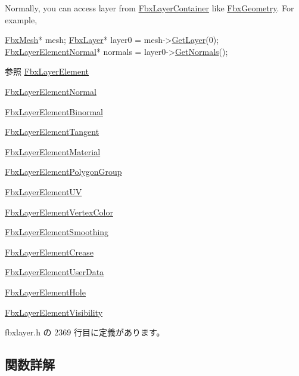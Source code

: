 Normally, you can access layer from \hyperlink{class_fbx_layer_container}{Fbx\+Layer\+Container} like \hyperlink{class_fbx_geometry}{Fbx\+Geometry}. For example, 
\begin{DoxyCode}
\hyperlink{class_fbx_mesh}{FbxMesh}* mesh;
\hyperlink{class_fbx_layer}{FbxLayer}* layer0 = mesh->\hyperlink{class_fbx_layer_container_a84f58c0498e55ff9123bba6040cccb7a}{GetLayer}(0);
\hyperlink{class_fbx_layer_element_normal}{FbxLayerElementNormal}* normals = layer0->\hyperlink{class_fbx_layer_ae29a7357ab32d3a298d85940e703b65d}{GetNormals}();
\end{DoxyCode}


\begin{DoxySeeAlso}{参照}
\hyperlink{class_fbx_layer_element}{Fbx\+Layer\+Element} 

\hyperlink{class_fbx_layer_element_normal}{Fbx\+Layer\+Element\+Normal} 

\hyperlink{class_fbx_layer_element_binormal}{Fbx\+Layer\+Element\+Binormal} 

\hyperlink{class_fbx_layer_element_tangent}{Fbx\+Layer\+Element\+Tangent} 

\hyperlink{class_fbx_layer_element_material}{Fbx\+Layer\+Element\+Material} 

\hyperlink{class_fbx_layer_element_polygon_group}{Fbx\+Layer\+Element\+Polygon\+Group} 

\hyperlink{class_fbx_layer_element_u_v}{Fbx\+Layer\+Element\+UV} 

\hyperlink{class_fbx_layer_element_vertex_color}{Fbx\+Layer\+Element\+Vertex\+Color} 

\hyperlink{class_fbx_layer_element_smoothing}{Fbx\+Layer\+Element\+Smoothing} 

\hyperlink{class_fbx_layer_element_crease}{Fbx\+Layer\+Element\+Crease} 

\hyperlink{class_fbx_layer_element_user_data}{Fbx\+Layer\+Element\+User\+Data} 

\hyperlink{class_fbx_layer_element_hole}{Fbx\+Layer\+Element\+Hole} 

\hyperlink{class_fbx_layer_element_visibility}{Fbx\+Layer\+Element\+Visibility} 
\end{DoxySeeAlso}


 fbxlayer.\+h の 2369 行目に定義があります。



\subsection{関数詳解}
\mbox{\label{class_fbx_layer_a9922eb8a5f4cd1c6c5084f96eab5c4a8}} 
